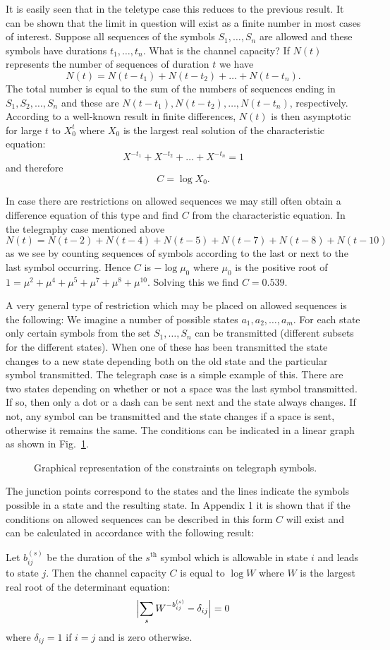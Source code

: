 It is easily seen that in the teletype case this reduces to the previous
result.  It can be shown that the limit in question will exist as a
finite number in most cases of interest.  Suppose all sequences of the
symbols $S_1,\dots,S_n$ are allowed and these symbols have durations
$t_1,\dots,t_n$.  What is the channel capacity?  If $N(t)$ represents
the number of sequences of duration $t$ we have
$$
N(t) = N(t-t_1) + N(t-t_2) + \dots + N(t-t_n).
$$
The total number is equal to the sum of the numbers of sequences ending
in $S_1,S_2,\dots,S_n$ and these are $N(t-t_1),N(t-t_2),\dots,N(t-t_n)$,
respectively.  According to a well-known result in finite differences,
$N(t)$ is then asymptotic for large $t$ to $X_0^t$ where $X_0$ is the
largest real solution of the characteristic equation:
$$
X^{-t_1} + X^{-t_2} + \dots + X^{-t_n} = 1
$$
and therefore
$$
C = \log X_0.
$$

In case there are restrictions on allowed sequences we may still
often obtain a difference equation of this type and find $C$ from the
characteristic equation.  In the telegraphy case mentioned above
$$
N(t) = N(t-2) + N(t-4) + N(t-5) + N(t-7) + N(t-8) + N(t-10)
$$
as we see by counting sequences of symbols according to the last or
next to the last symbol occurring.  Hence $C$ is $- \log \mu_0$ where
$\mu_0$ is the positive root of $1= \mu^2 + \mu^4 + \mu^5 + \mu^7 +
\mu^8 + \mu^{10}$.  Solving this we find $C= 0.539$.

A very general type of restriction which may be placed on allowed
sequences is the following: We imagine a number of possible states
$a_1,a_2,\dots,\allowbreak a_m$.  For each state only certain symbols from the
set $S_1,\dots,S_n$ can be transmitted (different subsets for the
different states).  When one of these has been transmitted the state
changes to a new state depending both on the old state and the particular
symbol transmitted.  The telegraph case is a simple example of this.
There are two states depending on whether or not a space was the last
symbol transmitted.  If so, then only a dot or a dash can be sent next
and the state always changes.  If not, any symbol can be transmitted and
the state changes if a space is sent, otherwise it remains the same.  The
conditions can be indicated in a linear graph as shown in Fig.~\ref{fig:2}.
\begin{figure}[ht]
\centerline{}
\caption{Graphical representation of the constraints on telegraph symbols.}
\label{fig:2}
\end{figure}
The junction points correspond to the states and the lines indicate the
symbols possible in a state and the resulting state.  In Appendix 1 it
is shown that if the conditions on allowed sequences can be described
in this form $C$  will exist and can be calculated in accordance with
the following result:
\begin{theorem}
\label{thm:1}
Let $b_{ij}^{(s)}$ be the duration of the $s^{\text{th}}$ symbol which
is allowable in state $i$ and leads to state $j$.  Then the channel
capacity $C$ is equal to $\log W$ where $W$ is the largest real root of the
determinant equation:
$$
\Bigl| \sum_s W^{-b_{ij}^{(s)}} - \delta_{ij} \Bigr| = 0
$$
where $\delta_{ij} =1$ if $i=j$ and is zero otherwise.
\end{theorem}

